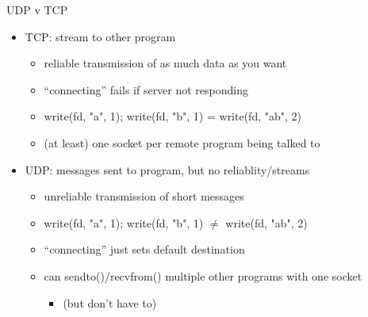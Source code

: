 \begin{frame}[fragile]{UDP v TCP}
    \begin{itemize}
    \item TCP: stream to other program
        \begin{itemize}
        \item reliable transmission of as much data as you want
        \item ``connecting'' fails if server not responding
        \item write(fd, "a", 1); write(fd, "b", 1) = write(fd, "ab", 2)
        \item (at least) one socket per remote program being talked to
        \end{itemize}
    \item UDP: messages sent to program, but no reliablity/streams
        \begin{itemize}
        \item unreliable transmission of short messages
        \item write(fd, "a", 1); write(fd, "b", 1) $\not=$ write(fd, "ab", 2)
        \item ``connecting'' just sets default destination
        \item can sendto()/recvfrom() multiple other programs with one socket
            \begin{itemize}
                \item (but don't have to)
            \end{itemize}
        \end{itemize}
    \end{itemize}
\end{frame}
